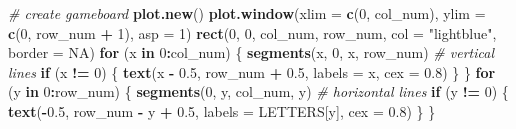 \documentclass[
]{article}
\newenvironment{Shaded}{\begin{snugshade}}{\end{snugshade}}
\newcommand{\AttributeTok}[1]{\textcolor[rgb]{0.13,0.29,0.53}{#1}}
\newcommand{\CommentTok}[1]{\textcolor[rgb]{0.56,0.35,0.01}{\textit{#1}}}
\newcommand{\ConstantTok}[1]{\textcolor[rgb]{0.56,0.35,0.01}{#1}}
\newcommand{\ControlFlowTok}[1]{\textcolor[rgb]{0.13,0.29,0.53}{\textbf{#1}}}
\newcommand{\DecValTok}[1]{\textcolor[rgb]{0.00,0.00,0.81}{#1}}
\newcommand{\FloatTok}[1]{\textcolor[rgb]{0.00,0.00,0.81}{#1}}
\newcommand{\FunctionTok}[1]{\textcolor[rgb]{0.13,0.29,0.53}{\textbf{#1}}}
\newcommand{\NormalTok}[1]{#1}
\newcommand{\SpecialCharTok}[1]{\textcolor[rgb]{0.81,0.36,0.00}{\textbf{#1}}}
\newcommand{\StringTok}[1]{\textcolor[rgb]{0.31,0.60,0.02}{#1}}
\begin{document}
\begin{Shaded}
\begin{Highlighting}[]
  \CommentTok{\# create gameboard }
  \FunctionTok{plot.new}\NormalTok{()}
  \FunctionTok{plot.window}\NormalTok{(}\AttributeTok{xlim =} \FunctionTok{c}\NormalTok{(}\DecValTok{0}\NormalTok{, col\_num), }\AttributeTok{ylim =} \FunctionTok{c}\NormalTok{(}\DecValTok{0}\NormalTok{, row\_num }\SpecialCharTok{+} \DecValTok{1}\NormalTok{), }\AttributeTok{asp =} \DecValTok{1}\NormalTok{)}
  \FunctionTok{rect}\NormalTok{(}\DecValTok{0}\NormalTok{, }\DecValTok{0}\NormalTok{, col\_num, row\_num, }\AttributeTok{col =} \StringTok{"lightblue"}\NormalTok{, }\AttributeTok{border =} \ConstantTok{NA}\NormalTok{)}
  \ControlFlowTok{for}\NormalTok{ (x }\ControlFlowTok{in} \DecValTok{0}\SpecialCharTok{:}\NormalTok{col\_num) \{}
    \FunctionTok{segments}\NormalTok{(x, }\DecValTok{0}\NormalTok{, x, row\_num) }\CommentTok{\# vertical lines}
    \ControlFlowTok{if}\NormalTok{ (x }\SpecialCharTok{!=} \DecValTok{0}\NormalTok{) \{}
      \FunctionTok{text}\NormalTok{(x }\SpecialCharTok{{-}} \FloatTok{0.5}\NormalTok{, row\_num }\SpecialCharTok{+} \FloatTok{0.5}\NormalTok{, }\AttributeTok{labels =}\NormalTok{ x, }\AttributeTok{cex =} \FloatTok{0.8}\NormalTok{)}
\NormalTok{    \}}
\NormalTok{  \}}
  \ControlFlowTok{for}\NormalTok{ (y }\ControlFlowTok{in} \DecValTok{0}\SpecialCharTok{:}\NormalTok{row\_num) \{}
    \FunctionTok{segments}\NormalTok{(}\DecValTok{0}\NormalTok{, y, col\_num, y) }\CommentTok{\# horizontal lines}
    \ControlFlowTok{if}\NormalTok{ (y }\SpecialCharTok{!=} \DecValTok{0}\NormalTok{) \{}
      \FunctionTok{text}\NormalTok{(}\SpecialCharTok{{-}}\FloatTok{0.5}\NormalTok{, row\_num }\SpecialCharTok{{-}}\NormalTok{ y }\SpecialCharTok{+} \FloatTok{0.5}\NormalTok{, }\AttributeTok{labels =}\NormalTok{ LETTERS[y], }\AttributeTok{cex =} \FloatTok{0.8}\NormalTok{)}
\NormalTok{    \}}
\NormalTok{  \}}
  

\end{Highlighting}
\end{Shaded}
\end{document}

